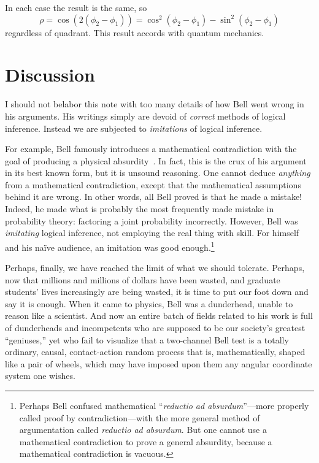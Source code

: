\documentclass[9pt,technote]{IEEEtran}
\begin{document}
In each case the result is the same, so
\begin{equation}
  \rho = \cos(2(\phi_2-\phi_1)) = \cos^2(\phi_2-\phi_1) - \sin^2(\phi_2-\phi_1)
\end{equation}
regardless of quadrant. This result accords with quantum mechanics.

\section{Discussion}

I should not belabor this note with too many details of how Bell went
wrong in his arguments. His writings simply are devoid of
{\em{correct}} methods of logical inference. Instead we are subjected
to {\em{imitations}} of logical inference.

For example, Bell famously introduces a mathematical contradiction
with the goal of producing a physical
absurdity~\cite{bertlmann:manuscript}. In fact, this is the crux of
his argument in its best known form, but it is unsound reasoning. One
cannot deduce {\em{anything}} from a mathematical contradiction,
except that the mathematical assumptions behind it are wrong. In other
words, all Bell proved is that he made a mistake! Indeed, he made what
is probably the most frequently made mistake in probability theory:
factoring a joint probability incorrectly. However, Bell was
{\em{imitating}} logical inference, not employing the real thing with
skill. For himself and his naïve audience, an imitation was good
enough.\footnote{Perhaps Bell confused mathematical ``{\em{reductio ad
      absurdum}}''---more properly called proof by
  contradiction---with the more general method of argumentation called
  {\em{reductio ad absurdum}}. But one cannot use a mathematical
  contradiction to prove a general absurdity, because a mathematical
  contradiction is vacuous.}

Perhaps, finally, we have reached the limit of what we should
tolerate. Perhaps, now that millions and millions of dollars have been
wasted, and graduate students' lives increasingly are being wasted, it
is time to put our foot down and say it is enough. When it came to
physics, Bell was a dunderhead, unable to reason like a scientist. And
now an entire batch of fields related to his work is full of
dunderheads and incompetents who are supposed to be our society’s
greatest ``geniuses,'' yet who fail to visualize that a two-channel
Bell test is a totally ordinary, causal, contact-action random process
that is, mathematically, shaped like a pair of wheels, which may have
imposed upon them any angular coordinate system one wishes.
\end{document}
